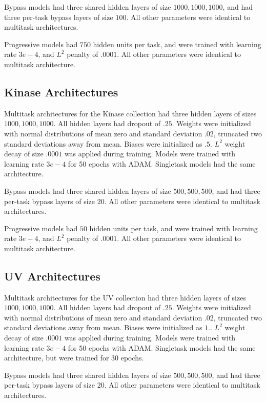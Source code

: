 Bypass models had three shared hidden layers of size $1000, 1000, 1000$, and had three per-task bypass layers of size $100$. All other parameters were identical to multitask architectures.

Progressive models had $750$ hidden units per task, and were trained with learning rate $3e-4$, and $L^2$ penalty of $.0001$. All other parameters were identical to multitask architecture.

\subsection{Kinase Architectures}
Multitask architectures for the Kinase collection had three hidden layers of sizes $1000, 1000, 1000$. All hidden layers had dropout of $.25$. Weights were initialized with normal distributions of mean zero and standard deviation $.02$, truncated two standard deviations away from mean. Biases were initialized as $.5$. $L^2$ weight decay of size $.0001$ was applied during training. Models were trained with learning rate $3e-4$ for 50 epochs with ADAM. Singletask models had the same architecture.

Bypass models had three shared hidden layers of size $500, 500, 500$, and had three per-task bypass layers of size $20$. All other parameters were identical to multitask architectures.

Progressive models had $50$ hidden units per task, and were trained with learning rate $3e-4$, and $L^2$ penalty of $.0001$. All other parameters were identical to multitask architecture.

\subsection{UV Architectures}
Multitask architectures for the UV collection had three hidden layers of sizes $1000, 1000, 1000$. All hidden layers had dropout of $.25$. Weights were initialized with normal distributions of mean zero and standard deviation $.02$, truncated two standard deviations away from mean. Biases were initialized as $1.$. $L^2$ weight decay of size $.0001$ was applied during training. Models were trained with learning rate $3e-4$ for 50 epochs with ADAM. Singletask models had the same architecture, but were trained for $30$ epochs.

Bypass models had three shared hidden layers of size $500, 500, 500$, and had three per-task bypass layers of size $20$. All other parameters were identical to multitask architectures.

